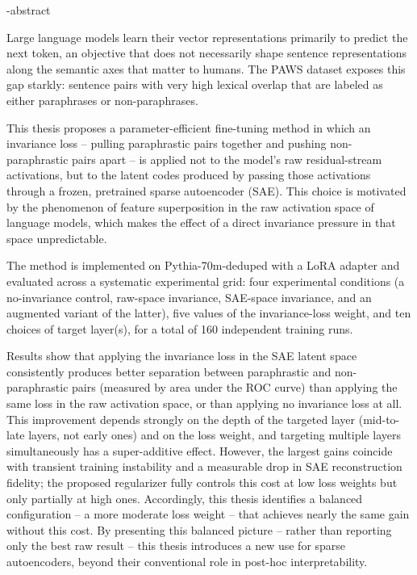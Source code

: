 \en-abstract{
Large language models learn their vector representations primarily to predict the next token, an objective that does not necessarily shape sentence representations along the semantic axes that matter to humans. The PAWS dataset exposes this gap starkly: sentence pairs with very high lexical overlap that are labeled as either paraphrases or non-paraphrases.%

This thesis proposes a parameter-efficient fine-tuning method in which an invariance loss -- pulling paraphrastic pairs together and pushing non-paraphrastic pairs apart -- is applied not to the model's raw residual-stream activations, but to the latent codes produced by passing those activations through a frozen, pretrained sparse autoencoder (SAE). This choice is motivated by the phenomenon of feature superposition in the raw activation space of language models, which makes the effect of a direct invariance pressure in that space unpredictable.%

The method is implemented on Pythia-70m-deduped with a LoRA adapter and evaluated across a systematic experimental grid: four experimental conditions (a no-invariance control, raw-space invariance, SAE-space invariance, and an augmented variant of the latter), five values of the invariance-loss weight, and ten choices of target layer(s), for a total of 160 independent training runs.

Results show that applying the invariance loss in the SAE latent space consistently produces better separation between paraphrastic and non-paraphrastic pairs (measured by area under the ROC curve) than applying the same loss in the raw activation space, or than applying no invariance loss at all. This improvement depends strongly on the depth of the targeted layer (mid-to-late layers, not early ones) and on the loss weight, and targeting multiple layers simultaneously has a super-additive effect. However, the largest gains coincide with transient training instability and a measurable drop in SAE reconstruction fidelity; the proposed regularizer fully controls this cost at low loss weights but only partially at high ones. Accordingly, this thesis identifies a balanced configuration -- a more moderate loss weight -- that achieves nearly the same gain without this cost. By presenting this balanced picture -- rather than reporting only the best raw result -- this thesis introduces a new use for sparse autoencoders, beyond their conventional role in post-hoc interpretability.
}
